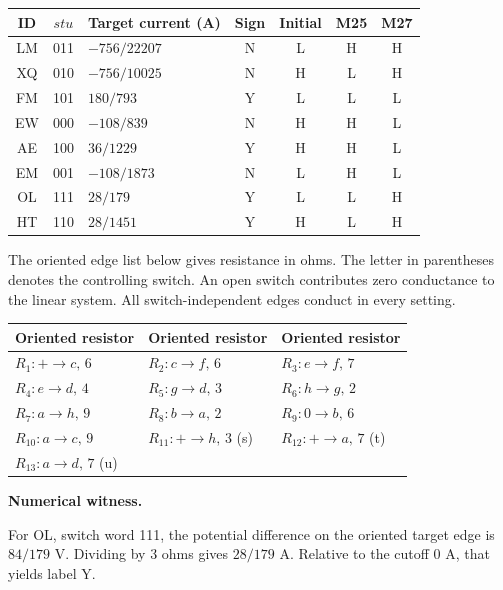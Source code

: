 \documentclass[12pt,letterpaper]{article}
\newcommand{\reading}[2]{\par\smallskip\textsf{\color{accent}\bfseries #1}\enspace #2\par}
\begin{document}
\begin{center}{\small\setlength{\tabcolsep}{4pt}\begin{tabularx}{\linewidth}{@{}ccYcccc@{}}\toprule
ID & $stu$ & Target current (A) & Sign & Initial & M25 & M27\\ \midrule
LM & 011 & $-756/22207$ & N & L & H & H\\
XQ & 010 & $-756/10025$ & N & H & L & H\\
FM & 101 & $180/793$ & Y & L & L & L\\
EW & 000 & $-108/839$ & N & H & H & L\\
AE & 100 & $36/1229$ & Y & H & H & L\\
EM & 001 & $-108/1873$ & N & L & H & L\\
OL & 111 & $28/179$ & Y & L & L & H\\
HT & 110 & $28/1451$ & Y & H & L & H\\
\bottomrule\end{tabularx}}\end{center}

The oriented edge list below gives resistance in ohms. The letter in parentheses denotes the controlling switch. An open switch contributes zero conductance to the linear system. All switch-independent edges conduct in every setting.

\begin{center}{\footnotesize\setlength{\tabcolsep}{4pt}\begin{tabularx}{\linewidth}{@{}YYY@{}}\toprule
Oriented resistor & Oriented resistor & Oriented resistor\\ \midrule
$R_{1}: +\!\to\!c,\,6$ & $R_{2}: c\!\to\!f,\,6$ & $R_{3}: e\!\to\!f,\,7$\\
$R_{4}: e\!\to\!d,\,4$ & $R_{5}: g\!\to\!d,\,3$ & $R_{6}: h\!\to\!g,\,2$\\
$R_{7}: a\!\to\!h,\,9$ & $R_{8}: b\!\to\!a,\,2$ & $R_{9}: 0\!\to\!b,\,6$\\
$R_{10}: a\!\to\!c,\,9$ & $R_{11}: +\!\to\!h,\,3$ (s) & $R_{12}: +\!\to\!a,\,7$ (t)\\
$R_{13}: a\!\to\!d,\,7$ (u) &  & \\
\bottomrule\end{tabularx}}\end{center}

\reading{Numerical witness.}{} For OL, switch word 111, the potential difference on the oriented target edge is $84/179$ V. Dividing by 3 ohms gives $28/179$ A. Relative to the cutoff $0$ A, that yields label Y.
\end{document}
